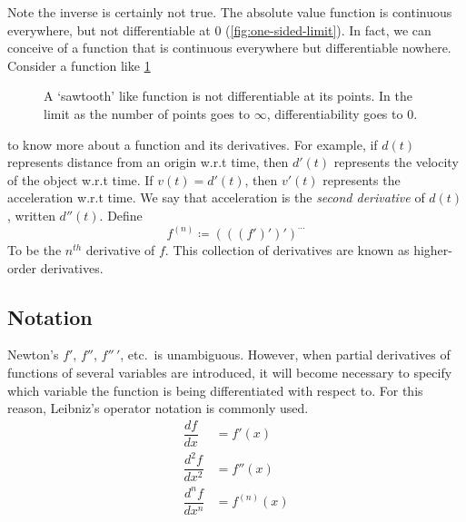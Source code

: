 \documentclass[10pt]{book}
\newcommand{\newthought}[1]{\vspace{0.5\baselineskip}\noindent{\scshape #1}}
\begin{document}
Note the inverse is certainly not true. The absolute value function is continuous everywhere, but not
differentiable at 0 (\cref{fig:one-sided-limit}).
In fact, we can conceive of a function that is continuous everywhere but differentiable nowhere. Consider a
function like \cref{fig:con-everywhere-diff-nowhere}
\begin{figure}[h]
  \centering
  \caption{A `sawtooth' like function is not differentiable at its points. In the limit as the number of
    points goes to $\infty$,
  differentiability goes to 0.}
  \label{fig:con-everywhere-diff-nowhere}
\end{figure}

\newthought{One may wish} to know more about a function and its derivatives. For example, if $d(t)$ represents
distance from an origin w.r.t time, then $d'(t)$ represents the velocity of the object w.r.t time. If
$v(t)=d'(t)$, then $v'(t)$ represents the acceleration w.r.t time. We say that acceleration is the
\emph{second derivative} of $d(t)$, written $d''(t)$. Define
\[f^{(n)} \coloneqq {(((f')')')}^{\cdots}\]
To be the $n^{th}$ derivative of $f$. This collection of derivatives are known as higher-order derivatives.

\subsection{Notation}
\newthought{For single variable functions} Newton's $f'$, $f''$, $f''\,'$, etc.\ is unambiguous. However, when partial
derivatives of functions of several variables are introduced, it will become necessary to specify which variable
the function is being differentiated with respect to. For this reason, Leibniz's operator notation is commonly used.
\begin{align*}
  \dfrac{df}{dx} &= f'(x) \\
  \dfrac{d^2 f}{dx^2} &= f''(x) \\
  \dfrac{d^n f}{dx^n} &= f^{(n)}(x)
\end{align*}
\end{document}
